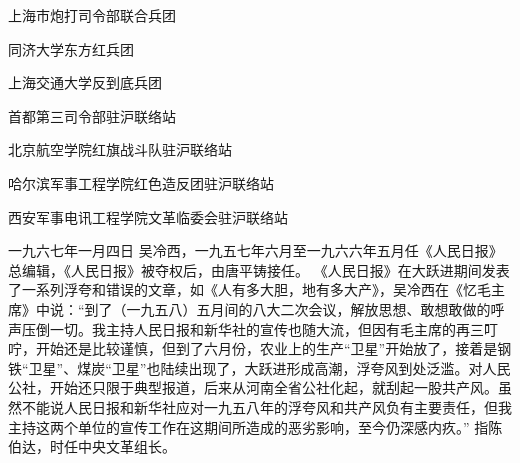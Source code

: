 \begin{maonote}
上海市炮打司令部联合兵团

同济大学东方红兵团

上海交通大学反到底兵团

首都第三司令部驻沪联络站

北京航空学院红旗战斗队驻沪联络站

哈尔滨军事工程学院红色造反团驻沪联络站

西安军事电讯工程学院文革临委会驻沪联络站

一九六七年一月四日
吴冷西，一九五七年六月至一九六六年五月任《人民日报》总编辑，《人民日报》被夺权后，由唐平铸接任。
《人民日报》在大跃进期间发表了一系列浮夸和错误的文章，如《人有多大胆，地有多大产》，吴冷西在《忆毛主席》中说：“到了（一九五八）五月间的八大二次会议，解放思想、敢想敢做的呼声压倒一切。我主持人民日报和新华社的宣传也随大流，但因有毛主席的再三叮咛，开始还是比较谨慎，但到了六月份，农业上的生产“卫星”开始放了，接着是钢铁“卫星”、煤炭“卫星”也陆续出现了，大跃进形成高潮，浮夸风到处泛滥。对人民公社，开始还只限于典型报道，后来从河南全省公社化起，就刮起一股共产风。虽然不能说人民日报和新华社应对一九五八年的浮夸风和共产风负有主要责任，但我主持这两个单位的宣传工作在这期间所造成的恶劣影响，至今仍深感内疚。”
指陈伯达，时任中央文革组长。
\end{maonote}
